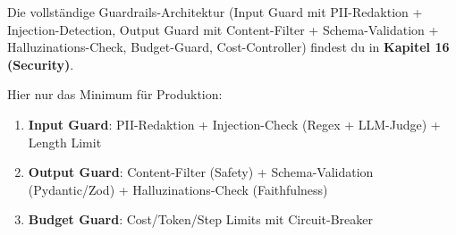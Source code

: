Die vollständige Guardrails-Architektur (Input Guard mit PII-Redaktion + Injection-Detection, Output Guard mit Content-Filter + Schema-Validation + Halluzinations-Check, Budget-Guard, Cost-Controller) findest du in \textbf{Kapitel 16 (Security)}.

Hier nur das Minimum für Produktion:
\begin{enumerate}
    \item \textbf{Input Guard}: PII-Redaktion + Injection-Check (Regex + LLM-Judge) + Length Limit
    \item \textbf{Output Guard}: Content-Filter (Safety) + Schema-Validation (Pydantic/Zod) + Halluzinations-Check (Faithfulness)
    \item \textbf{Budget Guard}: Cost/Token/Step Limits mit Circuit-Breaker
\end{enumerate}

